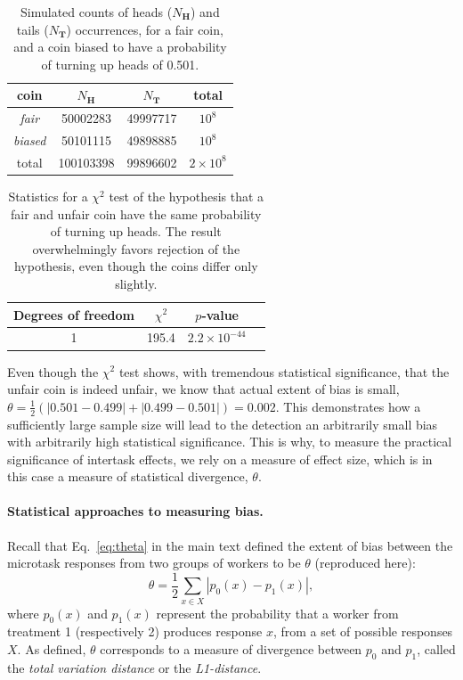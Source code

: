 \documentclass{sigchi}
\begin{document}
\setlength{\floatsep}{30pt plus 1.0pt minus 2.0pt}

\begin{table}
\centering
\begin{tabular}{c c c c}
\toprule
coin & $N_\mathbf{H}$ & $N_{\mathbf{T}}$ & total \\
\toprule
\textit{fair} & 50002283 & 49997717 & $10^8$\\
\textit{biased} & 50101115 & 49898885 & $10^8$ \\
\bottomrule
total & 100103398 & 99896602 & $2\times 10^8$ \\
\bottomrule
\end{tabular}
\caption{
	Simulated counts of heads ($N_\mathbf{H}$) and tails ($N_\mathbf{T}$)
	occurrences, for a fair coin, and a coin biased to have a probability
	of turning up heads of 0.501.
}
\label{table:coin}
\end{table}


\begin{table}
\centering
	\begin{tabular}{c c c c }
	\toprule
	Degrees of freedom & $\chi^2$ & $p$-value \\
	\toprule
	1 & 195.4 & $2.2 \times 10^{-44}$ \\
	\bottomrule
	\end{tabular}
\caption{
	Statistics for a $\chi^2$ test of the hypothesis that a fair and 
	unfair coin have the same probability of turning up heads.  
	The result overwhelmingly favors rejection of the hypothesis, even
	though the coins differ only slightly.
}
\label{table:coin_stats}
\end{table}

Even though the $\chi^2$ test shows, with tremendous statistical 
significance, that the unfair coin is indeed unfair, we know that actual 
extent of bias is small, 
$\theta = \frac{1}{2}\left( |0.501 - 0.499| + |0.499 - 0.501| \right) = 0.002$.
This demonstrates how a sufficiently large sample size will lead to the 
detection an arbitrarily 
small bias with arbitrarily high statistical significance. 
This is why, to measure the practical significance of intertask effects,
we rely on a measure of effect size, which is in this case a measure
of statistical divergence, $\theta$.

\paragraph{Statistical approaches to measuring bias.}
Recall that Eq.~\ref{eq:theta} in the main text defined the
extent of bias between the microtask responses from two groups
of workers to be $\theta$ (reproduced here):
\begin{equation}
	\theta = \frac{1}{2}\sum_{x \in X} \left| p_0(x) - p_1(x) \right|,
\end{equation}
where $p_0(x)$ and $p_1(x)$ represent the probability that a worker from
treatment 1 (respectively 2) produces response $x$, from a set of possible
responses $X$.  As defined, $\theta$ corresponds to a measure of divergence 
between $p_0$ and $p_1$, called the \textit{total variation distance} or the
\textit{L1-distance}.
\end{document}
